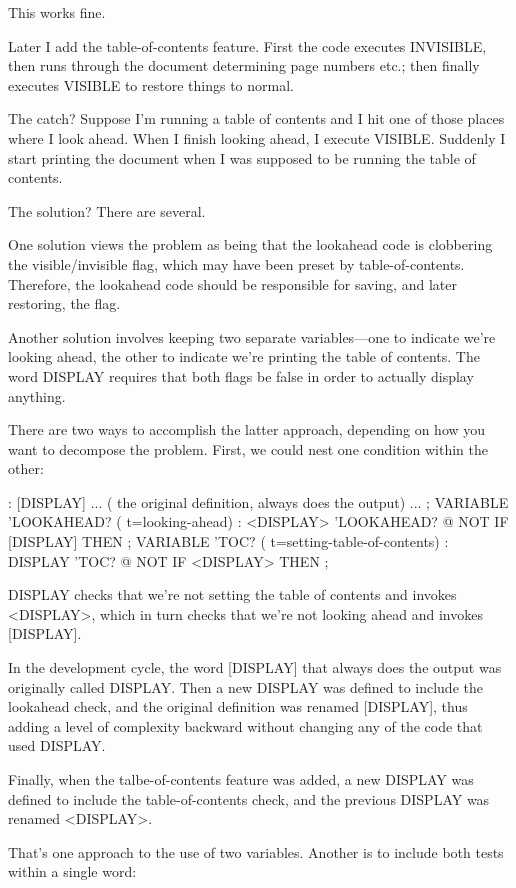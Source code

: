 This works fine.

Later I add the table-of-contents feature. First the code executes
INVISIBLE, then runs through the document determining page
numbers etc.; then finally executes VISIBLE to restore things to normal.

The catch? Suppose I'm running a table of contents and I hit one of
those places where I look ahead. When I finish looking ahead, I execute
VISIBLE. Suddenly I start printing the document when I was supposed
to be running the table of contents.

The solution? There are several.

One solution views the problem as being that the lookahead code is
clobbering the visible/invisible flag, which may have been preset by
table-of-contents. Therefore, the lookahead code should be responsible for
saving, and later restoring, the flag.

Another solution involves keeping two separate variables---one to
indicate we're looking ahead, the other to indicate we're printing the
table of contents. The word DISPLAY requires that both flags be false in
order to actually display anything.

There are two ways to accomplish the latter approach, depending on
how you want to decompose the problem. First, we could nest one condition
within the other:

\begin{Code}
: [DISPLAY]  ...
( the original definition, always does the output) ... ;
VARIABLE 'LOOKAHEAD?  ( t=looking-ahead)
: <DISPLAY>   'LOOKAHEAD? @ NOT IF  [DISPLAY]  THEN ;
VARIABLE 'TOC?  ( t=setting-table-of-contents)
: DISPLAY   'TOC? @ NOT IF  <DISPLAY>  THEN ;
\end{Code}
DISPLAY checks that we're not setting the table of contents and invokes
<DISPLAY>, which in turn checks that we're not looking ahead
and invokes [DISPLAY].

In the development cycle, the word [DISPLAY] that always does
the output was originally called DISPLAY. Then a new DISPLAY was
defined to include the lookahead check, and the original definition was
renamed [DISPLAY], thus adding a level of complexity backward
without changing any of the code that used DISPLAY.

Finally, when the talbe-of-contents feature was added, a new DISPLAY
was defined to include the table-of-contents check, and the
previous DISPLAY was renamed <DISPLAY>.

That's one approach to the use of two variables. Another is to include
both tests within a single word:

